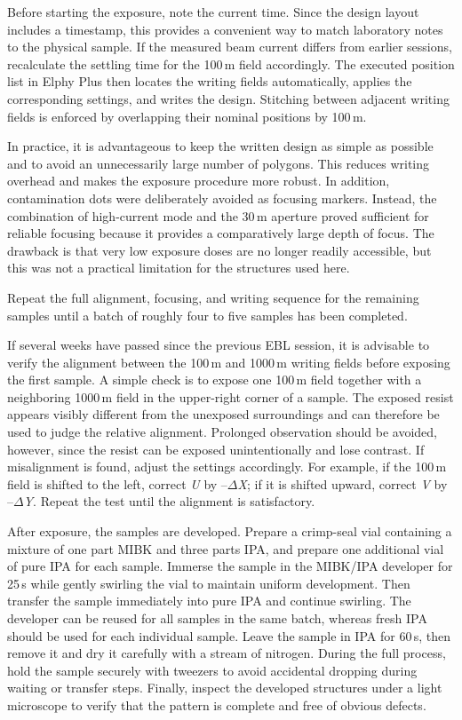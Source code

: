         Before starting the exposure, note the current time. Since the design layout includes a timestamp, this provides a convenient way to match laboratory notes to the physical sample. If the measured beam current differs from earlier sessions, recalculate the settling time for the 100\,\textmu m field accordingly. The executed position list in Elphy Plus then locates the writing fields automatically, applies the corresponding settings, and writes the design. Stitching between adjacent writing fields is enforced by overlapping their nominal positions by 100\,\textmu m.

        In practice, it is advantageous to keep the written design as simple as possible and to avoid an unnecessarily large number of polygons. This reduces writing overhead and makes the exposure procedure more robust. In addition, contamination dots were deliberately avoided as focusing markers. Instead, the combination of high-current mode and the 30\,\textmu m aperture proved sufficient for reliable focusing because it provides a comparatively large depth of focus. The drawback is that very low exposure doses are no longer readily accessible, but this was not a practical limitation for the structures used here.
        
        Repeat the full alignment, focusing, and writing sequence for the remaining samples until a batch of roughly four to five samples has been completed.

        If several weeks have passed since the previous EBL session, it is advisable to verify the alignment between the 100\,\textmu m and 1000\,\textmu m writing fields before exposing the first sample. A simple check is to expose one 100\,\textmu m field together with a neighboring 1000\,\textmu m field in the upper-right corner of a sample. The exposed resist appears visibly different from the unexposed surroundings and can therefore be used to judge the relative alignment. Prolonged observation should be avoided, however, since the resist can be exposed unintentionally and lose contrast. If misalignment is found, adjust the settings accordingly. For example, if the 100\,\textmu m field is shifted to the left, correct \textit{U} by --$\Delta$\textit{X}; if it is shifted upward, correct \textit{V} by --$\Delta$\textit{Y}. Repeat the test until the alignment is satisfactory.

        After exposure, the samples are developed. Prepare a crimp-seal vial containing a mixture of one part MIBK and three parts IPA, and prepare one additional vial of pure IPA for each sample. Immerse the sample in the MIBK/IPA developer for 25\,s while gently swirling the vial to maintain uniform development. Then transfer the sample immediately into pure IPA and continue swirling. The developer can be reused for all samples in the same batch, whereas fresh IPA should be used for each individual sample. Leave the sample in IPA for 60\,s, then remove it and dry it carefully with a stream of nitrogen. During the full process, hold the sample securely with tweezers to avoid accidental dropping during waiting or transfer steps. Finally, inspect the developed structures under a light microscope to verify that the pattern is complete and free of obvious defects.


